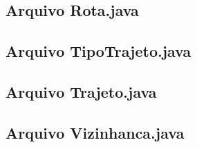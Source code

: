 

\newpage

\subsection{Arquivo Rota.java}



\newpage

\subsection{Arquivo TipoTrajeto.java}



\newpage

\subsection{Arquivo Trajeto.java}



\newpage

\subsection{Arquivo Vizinhanca.java}



\newpage

